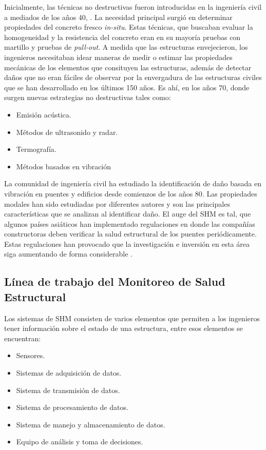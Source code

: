 Inicialmente, las técnicas no destructivas fueron introducidas en la ingeniería civil a mediados de los años 40, \citep{mohamed2014}. La necesidad principal surgió en determinar propiedades del concreto fresco \textit{in-situ}. Estas técnicas, que buscaban evaluar la homogeneidad y la resistencia del concreto eran en su mayoría pruebas con martillo y pruebas de \textit{pull-out}. A medida que las estructuras envejecieron, los ingenieros necesitaban idear maneras de medir o estimar las propiedades mecánicas de los elementos que consituyen las estructuras, además de detectar daños que no eran fáciles de observar por la envergadura de las estructuras civiles que se han desarrollado en los últimos 150 años. Es ahí, en los años 70, donde surgen nuevas estrategias no destructivas tales como:

    \begin{itemize}
        \item Emisión acústica.
        \item Métodos de ultrasonido y radar.
        \item Termografía.
        \item Métodos basados en vibración
    \end{itemize}

La comunidad de ingeniería civil ha estudiado la identificación de daño basada en vibración en puentes y edificios desde comienzos de los años 80. Las propiedades modales han sido estudiadas por diferentes autores y son las principales características que se analizan al identificar daño. El auge del SHM es tal, que algunos países asiáticos han implementado regulaciones en donde las compañías constructoras deben verificar la salud estructural de los puentes periódicamente. Estas regulaciones han provocado que la investigación e inversión en esta área siga aumentando de forma considerable \citep{chen2018}. 

\subsection{Línea de trabajo del Monitoreo de Salud Estructural}

Los sistemas de SHM consisten de varios elementos que permiten a los ingenieros tener información sobre el estado de una estructura, entre esos elementos se encuentran:

\begin{itemize}
    \item Sensores.
    \item Sistemas de adquisición de datos.
    \item Sistema de transmisión de datos.
    \item Sistema de procesamiento de datos.
    \item Sistema de manejo y almacenamiento de datos.
    \item Equipo de análisis y toma de decisiones.
\end{itemize}

